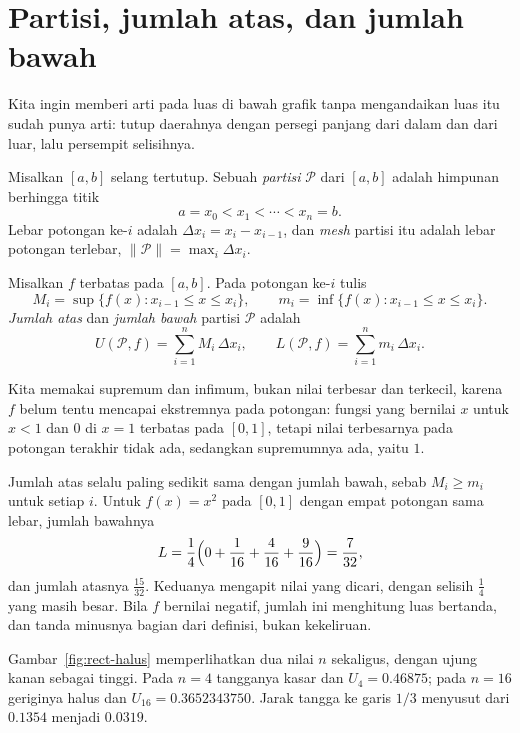 \section{Partisi, jumlah atas, dan jumlah bawah}

Kita ingin memberi arti pada luas di bawah grafik tanpa mengandaikan luas itu sudah
punya arti: tutup daerahnya dengan persegi panjang dari dalam dan dari luar, lalu
persempit selisihnya.

\begin{definisi}
Misalkan $[a,b]$ selang tertutup. Sebuah \emph{partisi} $\mathcal{P}$ dari $[a,b]$
adalah himpunan berhingga titik
\[
a=x_0<x_1<\cdots<x_n=b .
\]
Lebar potongan ke-$i$ adalah $\Delta x_i=x_i-x_{i-1}$, dan \emph{mesh} partisi itu
adalah lebar potongan terlebar, $\|\mathcal{P}\|=\max_i\Delta x_i$.

Misalkan $f$ terbatas pada $[a,b]$. Pada potongan ke-$i$ tulis
\[
M_i=\sup\{f(x):x_{i-1}\le x\le x_i\},\qquad
m_i=\inf\{f(x):x_{i-1}\le x\le x_i\}.
\]
\emph{Jumlah atas} dan \emph{jumlah bawah} partisi $\mathcal{P}$ adalah
\begin{equation}
U(\mathcal{P},f)=\sum_{i=1}^{n}M_i\,\Delta x_i,
\qquad
L(\mathcal{P},f)=\sum_{i=1}^{n}m_i\,\Delta x_i .
\end{equation}
\end{definisi}

Kita memakai supremum dan infimum, bukan nilai terbesar dan terkecil, karena $f$ belum
tentu mencapai ekstremnya pada potongan: fungsi yang bernilai $x$ untuk $x<1$ dan $0$
di $x=1$ terbatas pada $[0,1]$, tetapi nilai terbesarnya pada potongan terakhir tidak
ada, sedangkan supremumnya ada, yaitu $1$.

Jumlah atas selalu paling sedikit sama dengan jumlah bawah, sebab $M_i\ge m_i$ untuk
setiap $i$. Untuk $f(x)=x^2$ pada $[0,1]$ dengan empat potongan sama lebar, jumlah
bawahnya
\[
L=\frac{1}{4}\Bigl(0+\frac{1}{16}+\frac{4}{16}+\frac{9}{16}\Bigr)=\frac{7}{32},
\]
dan jumlah atasnya $\frac{15}{32}$. Keduanya mengapit nilai yang dicari, dengan selisih
$\frac14$ yang masih besar. Bila $f$ bernilai negatif, jumlah ini menghitung luas
bertanda, dan tanda minusnya bagian dari definisi, bukan kekeliruan.

Gambar~\ref{fig:rect-halus} memperlihatkan dua nilai $n$ sekaligus, dengan ujung kanan
sebagai tinggi. Pada $n=4$ tangganya kasar dan $U_4=0.46875$; pada $n=16$ geriginya
halus dan $U_{16}=0.3652343750$. Jarak tangga ke garis $1/3$ menyusut dari $0.1354$
menjadi $0.0319$.

